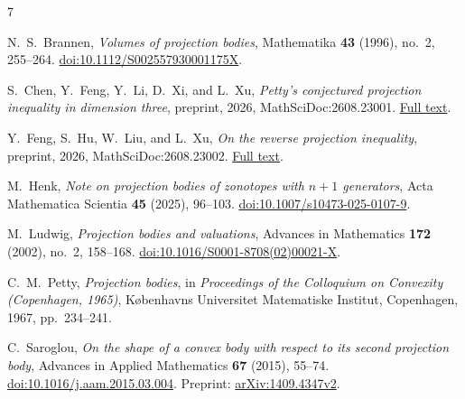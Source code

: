 \documentclass[11pt]{article}
\begin{document}
\begin{thebibliography}{7}

N.~S.~Brannen,
\emph{Volumes of projection bodies},
Mathematika \textbf{43} (1996), no.~2, 255--264.
\href{https://doi.org/10.1112/S002557930001175X}{doi:10.1112/S002557930001175X}.

S.~Chen, Y.~Feng, Y.~Li, D.~Xi, and L.~Xu,
\emph{Petty's conjectured projection inequality in dimension three},
preprint, 2026, MathSciDoc:2608.23001.
\href{https://archive.ymsc.tsinghua.edu.cn/pacm_download/741/12780-pettyinequality.pdf}{Full text}.

Y.~Feng, S.~Hu, W.~Liu, and L.~Xu,
\emph{On the reverse projection inequality},
preprint, 2026, MathSciDoc:2608.23002.
\href{https://archive.ymsc.tsinghua.edu.cn/pacm_download/743/12781--2026.8.26.pdf}{Full text}.

M.~Henk,
\emph{Note on projection bodies of zonotopes with \(n+1\) generators},
Acta Mathematica Scientia \textbf{45} (2025), 96--103.
\href{https://doi.org/10.1007/s10473-025-0107-9}{doi:10.1007/s10473-025-0107-9}.

M.~Ludwig,
\emph{Projection bodies and valuations},
Advances in Mathematics \textbf{172} (2002), no.~2, 158--168.
\href{https://doi.org/10.1016/S0001-8708(02)00021-X}{doi:10.1016/S0001-8708(02)00021-X}.

C.~M.~Petty,
\emph{Projection bodies},
in \emph{Proceedings of the Colloquium on Convexity (Copenhagen, 1965)},
K\o benhavns Universitet Matematiske Institut, Copenhagen, 1967,
pp.~234--241.

C.~Saroglou,
\emph{On the shape of a convex body with respect to its second projection body},
Advances in Applied Mathematics \textbf{67} (2015), 55--74.
\href{https://doi.org/10.1016/j.aam.2015.03.004}{doi:10.1016/j.aam.2015.03.004}.
Preprint:
\href{https://arxiv.org/abs/1409.4347v2}{arXiv:1409.4347v2}.

\end{thebibliography}
\end{document}

